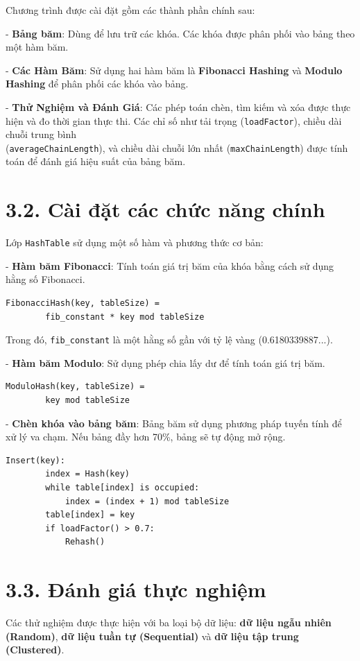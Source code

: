 \documentclass[12pt,a4paper]{report}
\begin{document}
Chương trình được cài đặt gồm các thành phần chính sau:

    - \textbf{Bảng băm}: Dùng để lưu trữ các khóa. Các khóa được phân phối vào bảng theo một hàm băm.
    
    - \textbf{Các Hàm Băm}: Sử dụng hai hàm băm là \textbf{Fibonacci Hashing} và \textbf{Modulo Hashing} để phân phối các khóa vào bảng.
    
    - \textbf{Thử Nghiệm và Đánh Giá}: Các phép toán chèn, tìm kiếm và xóa được thực hiện và đo thời gian thực thi. Các chỉ số như tải trọng (\texttt{loadFactor}), chiều dài chuỗi trung bình \\ (\texttt{averageChainLength}), và chiều dài chuỗi lớn nhất (\texttt{maxChainLength}) được tính toán để đánh giá hiệu suất của bảng băm.

\section*{3.2. Cài đặt các chức năng chính}
\noindent \indent Lớp \texttt{HashTable} sử dụng một số hàm và phương thức cơ bản:

    - \textbf{Hàm băm Fibonacci}: Tính toán giá trị băm của khóa bằng cách sử dụng hằng số Fibonacci.
    \begin{lstlisting}[style=numbered]
    FibonacciHash(key, tableSize) =
        fib_constant * key mod tableSize
    \end{lstlisting}
    Trong đó, \texttt{fib\_constant} là một hằng số gần với tỷ lệ vàng (0.6180339887...).
    
    - \textbf{Hàm băm Modulo}: Sử dụng phép chia lấy dư để tính toán giá trị băm.
    \begin{lstlisting}[style=numbered]
    ModuloHash(key, tableSize) =
        key mod tableSize
    \end{lstlisting}
    
    - \textbf{Chèn khóa vào bảng băm}: Bảng băm sử dụng phương pháp tuyến tính để xử lý va chạm. Nếu bảng đầy hơn 70\%, bảng sẽ tự động mở rộng.
    \begin{lstlisting}[style=numbered]
    Insert(key):
        index = Hash(key)
        while table[index] is occupied:
            index = (index + 1) mod tableSize
        table[index] = key
        if loadFactor() > 0.7:
            Rehash()
    \end{lstlisting}

\section*{3.3. Đánh giá thực nghiệm}
\noindent \indent Các thử nghiệm được thực hiện với ba loại bộ dữ liệu: \textbf{dữ liệu ngẫu nhiên (Random)}, \textbf{dữ liệu tuần tự (Sequential)} và \textbf{dữ liệu tập trung (Clustered)}.
\end{document}
